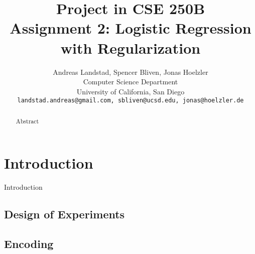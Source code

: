 \documentclass[10pt,twocolumn,letterpaper]{article}
\begin{document}
\title{
Project in CSE 250B\\
Assignment 2: Logistic Regression with Regularization}

\author{Andreas Landstad, Spencer Bliven, Jonas Hoelzler\\
Computer Science Department\\
University of California, San Diego\\
{\tt\small landstad.andreas@gmail.com, sbliven@ucsd.edu, jonas@hoelzler.de}
}%
\maketitle
\thispagestyle{empty}

\begin{abstract}
Abstract
\end{abstract}

\section{Introduction}
Introduction
\subsection{Design of Experiments}

\subsection{Encoding}
\end{document}
